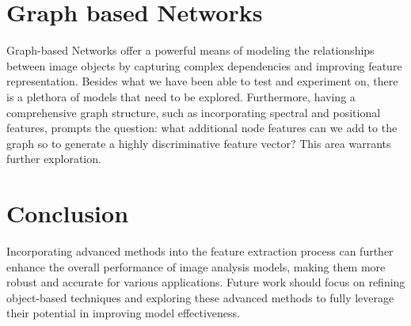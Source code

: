 \section{Graph based Networks }

Graph-based Networks offer a powerful means of modeling the relationships between image objects by capturing complex dependencies and improving feature representation. Besides what we have been able to test and experiment on, there is a plethora of models that need to be explored. Furthermore, having a comprehensive graph structure, such as incorporating spectral and positional features, prompts the question: what additional node features can we add to the graph so to generate a highly discriminative feature vector? This area warrants further exploration.

\section{Conclusion}

Incorporating advanced methods into the feature extraction process can further enhance the overall performance of image analysis models, making them more robust and accurate for various applications. Future work should focus on refining object-based techniques and exploring these advanced methods to fully leverage their potential in improving model effectiveness.
